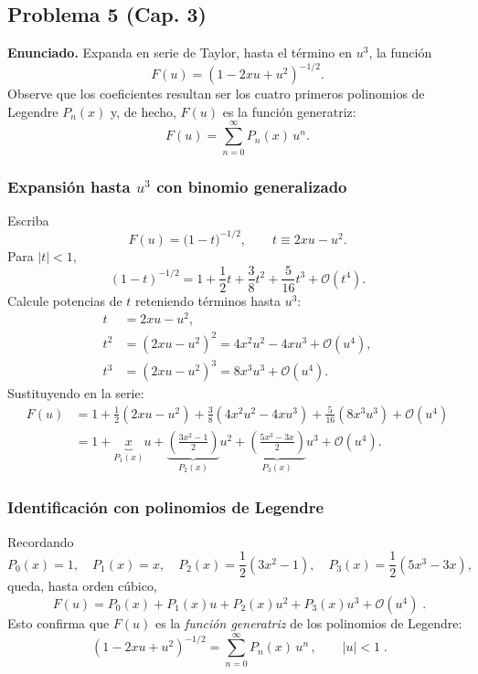 \documentclass{article}
\begin{document}
\subsection{Problema 5 (Cap. 3)} \vspace{0.5cm}

\textbf{Enunciado.} Expanda en serie de Taylor, hasta el término en $u^{3}$, la función
\[
F(u)=(1-2xu+u^{2})^{-1/2}.
\]
Observe que los coeficientes resultan ser los cuatro primeros polinomios de Legendre $P_n(x)$ y, de hecho, $F(u)$ es la función generatriz:
\[
F(u)=\sum_{n=0}^{\infty}P_n(x)\,u^n.
\]

\subsubsection*{Expansión hasta $u^3$ con binomio generalizado}
Escriba
\[
F(u)=\big(1-t\big)^{-1/2},\qquad t\equiv 2xu-u^{2}.
\]
Para $|t|<1$,
\[
(1-t)^{-1/2}=1+\frac{1}{2}t+\frac{3}{8}t^{2}+\frac{5}{16}t^{3}+\mathcal O(t^{4}).
\]
Calcule potencias de $t$ reteniendo términos hasta $u^{3}$:
\[
\begin{aligned}
t&=2xu-u^{2},\\
t^{2}&=(2xu-u^{2})^{2}=4x^{2}u^{2}-4xu^{3}+\mathcal O(u^{4}),\\
t^{3}&=(2xu-u^{2})^{3}=8x^{3}u^{3}+\mathcal O(u^{4}).
\end{aligned}
\]
Sustituyendo en la serie:
\[
\begin{aligned}
F(u)
&=1+\frac{1}{2}(2xu-u^{2})
+\frac{3}{8}(4x^{2}u^{2}-4xu^{3})
+\frac{5}{16}(8x^{3}u^{3})
+\mathcal O(u^{4})\\[4pt]
&=1+\underbrace{x}_{\displaystyle P_{1}(x)}u
+\underbrace{\left(\frac{3x^{2}-1}{2}\right)}_{\displaystyle P_{2}(x)}u^{2}
+\underbrace{\left(\frac{5x^{3}-3x}{2}\right)}_{\displaystyle P_{3}(x)}u^{3}
+\mathcal O(u^{4}).
\end{aligned}
\]

\subsubsection*{Identificación con polinomios de Legendre}
Recordando
\[
P_{0}(x)=1,\quad P_{1}(x)=x,\quad
P_{2}(x)=\frac{1}{2}(3x^{2}-1),\quad
P_{3}(x)=\frac{1}{2}(5x^{3}-3x),
\]
queda, hasta orden cúbico,
\[
\boxed{\;
F(u)=P_{0}(x)+P_{1}(x)u+P_{2}(x)u^{2}+P_{3}(x)u^{3}+\mathcal O(u^{4})\;}.
\]
Esto confirma que $F(u)$ es la \emph{función generatriz} de los polinomios de Legendre:
\[
\boxed{\;
(1-2xu+u^{2})^{-1/2}=\displaystyle\sum_{n=0}^{\infty}P_{n}(x)\,u^{n}\,,\qquad |u|<1\;}.
\]
\end{document}

